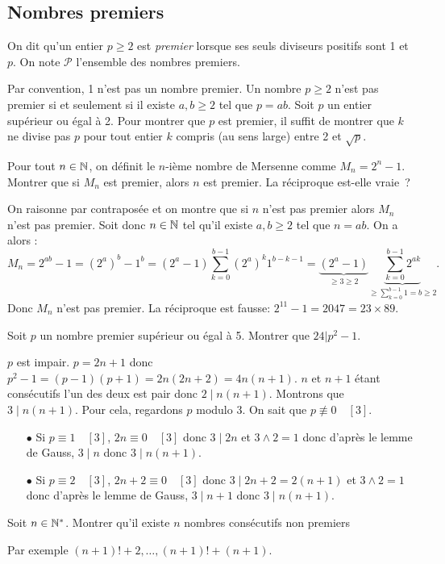 \documentclass{magnolia}
\begin{document}
\subsection{Nombres premiers}

\begin{definition}
On dit qu'un entier $p\geq 2$ est \emph{premier} lorsque ses seuls diviseurs
positifs sont 1 et $p$. On note $\mathcal{P}$ l'ensemble des nombres premiers.
\end{definition}

\begin{remarques}
\remarque Par convention, 1 n'est pas un nombre premier.
\remarque Un nombre $p\geq 2$ n'est pas premier si et seulement si il existe $a,b\geq 2$ tel que $p=ab$.
\remarque Soit $p$ un entier supérieur ou égal à 2. Pour montrer que $p$ est
  premier, il suffit de montrer que $k$ ne divise pas $p$ pour tout entier
  $k$ compris (au sens large) entre 2 et $\sqrt{p}$.
\end{remarques}

\begin{exos}
\exo Pour tout $n\in\mathbb{N}$, on définit le $n$-ième nombre de Mersenne comme
  $M_n=2^n-1$. Montrer que si $M_n$ est premier, alors $n$ est premier. La
  réciproque est-elle vraie~?
  \begin{sol}
  On raisonne par contraposée et on montre que si $n$ n'est pas premier alors $M_n$ n'est pas premier. Soit donc $n\in \mathbb{N}$ tel qu'il existe $a,b\geq 2$ tel que $n=ab$. On a alors :
  $$M_n=2^{ab}-1=(2^a)^b-1^b=(2^a-1)\sum_{k=0}^{b-1}(2^{a})^k1^{b-k-1}=\underbrace{(2^a-1)}_{\geq 3\geq 2}\underbrace{\sum_{k=0}^{b-1}2^{ak}}_{\geq \sum_{k=0}^{b-1}1=b\geq 2 }.$$ Donc $M_n$ n'est pas premier.
  La réciproque est fausse: $2^{11}-1=2047=23\times 89$.
  \end{sol}
\exo Soit $p$ un nombre premier supérieur ou égal à 5. Montrer que
  $24|p^2-1$.
  \begin{sol}
  $p$ est impair. $p=2n+1$ donc $p^2-1=(p-1)(p+1)=2n(2n+2)=4n(n+1)$.
  $n$ et $n+1$ étant consécutifs l'un des deux est pair donc $2\mid n(n+1)$. Montrons que $3\mid n(n+1)$. Pour cela, regardons $p$ modulo $3$. On sait que $p\not\equiv 0 \quad [3]$.
  \begin{itemize}
  \item[$\bullet$]Si $p\equiv 1 \quad [3]$, $2n\equiv 0 \quad [3]$ donc $3\mid 2n$ et $3\wedge 2=1$ donc d'après le lemme de Gauss, $3\mid n$ donc $3\mid n(n+1)$.
  \item[$\bullet$]Si $p\equiv 2 \quad [3]$, $2n+2\equiv 0 \quad [3]$ donc $3\mid 2n+2=2(n+1)$ et $3\wedge 2=1$ donc d'après le lemme de Gauss, $3\mid n+1$ donc $3\mid n(n+1)$.
  \end{itemize}
  \end{sol}
\exo Soit $n\in{\mathbb{N}^*}$. Montrer qu'il existe $n$ nombres consécutifs non
  premiers
  \begin{sol}
  Par exemple $(n+1)!+2,\ldots,(n+1)!+(n+1)$.
  \end{sol}
\end{exos}
\end{document}
